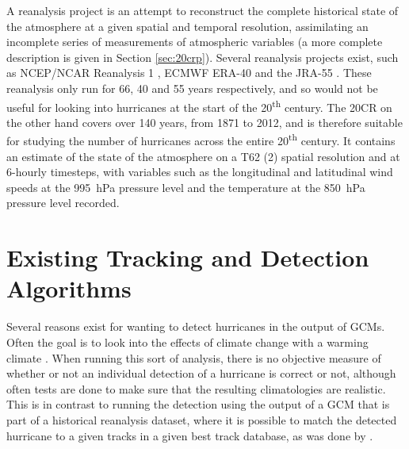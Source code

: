 \documentclass[pdftex,12pt,a4paper]{report}
\newcommand{\ts}{\textsuperscript}
\begin{document}

A reanalysis project is an attempt to reconstruct the complete historical state of the atmosphere at
a given spatial and temporal resolution, assimilating an incomplete series of measurements of
atmospheric variables (a more complete description is given in Section
\ref{sec:20crp}). Several reanalysis projects exist, such as NCEP/NCAR Reanalysis 1
\parencite{TODOCITE}, ECMWF ERA-40 \parencite{uppalaEra2006} and the JRA-55 \parencite{TODOCITE}.
These reanalysis only run for 66, 40 and 55 years respectively, and so would not be useful for
looking into hurricanes at the start of the 20\ts{th} century. The 20CR on the other hand covers
over 140 years, from 1871 to 2012, and is therefore suitable for studying the number of hurricanes
across the entire 20\ts{th} century.  It contains an estimate of the state of the atmosphere on a
T62 (2\textdegree) spatial resolution and at 6-hourly timesteps, with variables such as the
longitudinal and latitudinal wind speeds at the \SI{995}{hPa} pressure level and the temperature at
the \SI{850}{hPa} pressure level recorded.

\section{Existing Tracking and Detection Algorithms}


Several reasons exist for wanting to detect hurricanes in the output of GCMs. Often the goal is to
look into the effects of climate change with a warming climate \parencite{bengtsson1996, sugi2002,
yoshimura2006}. When running this sort of analysis, there is no objective measure of whether or not
an individual detection of a hurricane is correct or not, although often tests are done to make sure
that the resulting climatologies are realistic. This is in contrast to running the detection using
the output of a GCM that is part of a historical reanalysis dataset, where it is possible to match
the detected hurricane to a given tracks in a given best track database, as was done by
\textcite{walsh1995}.
\end{document}
